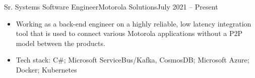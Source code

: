 \begin{cvsubsection}{Sr. Systems Software Engineer}{Motorola Solutions}{July 2021 -- Present}		
	\begin{itemize}
		\item Working as a back-end engineer on a highly reliable, low latency integration tool that is used to connect various Motorola applications without a P2P model between the products.
		\item Tech stack: C\#; Microsoft ServiceBus/Kafka, CosmosDB; Microsoft Azure; Docker; Kubernetes
	\end{itemize}
\end{cvsubsection}